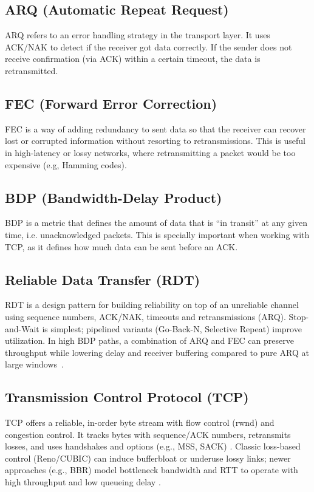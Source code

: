 \subsection{ARQ (Automatic Repeat Request)}
ARQ refers to an error handling strategy in the transport layer. It uses
ACK/NAK to detect if the receiver got data correctly. If the sender does not
receive confirmation (via ACK) within a certain timeout, the data is
retransmitted.

\subsection{FEC (Forward Error Correction)}
FEC is a way of adding redundancy to sent data so that the receiver can recover
lost or corrupted information without resorting to retransmissions. This is
useful in high-latency or lossy networks, where retransmitting a packet would
be too expensive (e.g, Hamming codes).

\subsection{BDP (Bandwidth-Delay Product)}
BDP is a metric that defines the amount of data that is ``in transit'' at any
given time, i.e. unacknowledged packets. This is specially important when
working with TCP, as it defines how much data can be sent before an ACK.

\subsection{Reliable Data Transfer (RDT)}
RDT is a design pattern for building reliability on top of an unreliable
channel using sequence numbers, ACK/NAK, timeouts and retransmissions (ARQ).
Stop-and-Wait is simplest; pipelined variants (Go-Back-N, Selective Repeat)
improve utilization. In high BDP paths, a combination of ARQ and FEC can
preserve throughput while lowering delay and receiver buffering compared to
pure ARQ at large windows~\cite{kurose:topdown8e,ghaderi2013scalablerdt}.

\subsection{Transmission Control Protocol (TCP)}
TCP offers a reliable, in-order byte stream with flow control (rwnd) and
congestion control. It tracks bytes with sequence/ACK numbers, retransmits
losses, and uses handshakes and options (e.g., MSS, SACK)
\cite{rfc793,kurose:topdown8e}. Classic loss-based control (Reno/CUBIC) can
induce bufferbloat or underuse lossy links; newer approaches (e.g., BBR) model
bottleneck bandwidth and RTT to operate with high throughput and low queueing
delay \cite{cardwell2017bbr}.

